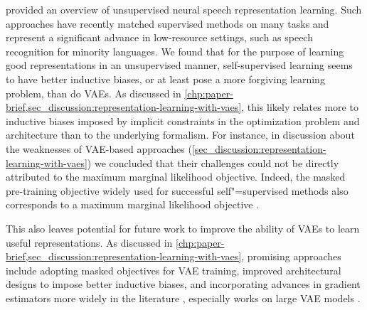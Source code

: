 \vspace{1em}
\textbf{} provided an overview of unsupervised neural speech representation learning. Such approaches have recently matched supervised methods on many tasks and represent a significant advance in low-resource settings, such as speech recognition for minority languages. 
We found that for the purpose of learning good representations in an unsupervised manner, self-supervised learning seems to have better inductive biases, or at least pose a more forgiving learning problem, than do VAEs. As discussed in \cref{chp:paper-brief,sec_discussion:representation-learning-with-vaes}, this likely relates more to inductive biases imposed by implicit constraints in the optimization problem and architecture than to the underlying formalism. 
For instance, in discussion about the weaknesses of VAE-based approaches (\cref{sec_discussion:representation-learning-with-vaes}) we concluded that their challenges could not be directly attributed to the maximum marginal likelihood objective. Indeed, the masked pre-training objective widely used for successful self"=supervised methods also corresponds to a maximum marginal likelihood objective \parencite{moreno-munoz_masked_2023}. 

This also leaves potential for future work to improve the ability of VAEs to learn useful representations. As discussed in \cref{chp:paper-brief,sec_discussion:representation-learning-with-vaes}, promising approaches include adopting masked objectives for VAE training, improved architectural designs to impose better inductive biases, and incorporating advances in gradient estimators more widely in the literature \parencite{rainforth_tighter_2019,roeder_sticking_2017,tucker_doubly_2019,bauer_generalized_2021}, especially works on large VAE models \parencite{maaloe_biva_2019,vahdat_nvae_2020,child_very_2021}. 



